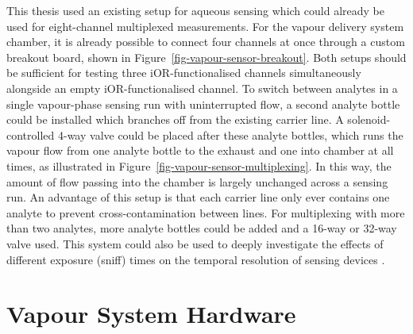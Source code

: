 \documentclass[
  a4paper,
]{scrbook}
\begin{document}
This thesis used an existing setup for aqueous sensing which could
already be used for eight-channel multiplexed measurements. For the
vapour delivery system chamber, it is already possible to connect four
channels at once through a custom breakout board, shown in
Figure~\ref{fig-vapour-sensor-breakout}. Both setups should be
sufficient for testing three iOR-functionalised channels simultaneously
alongside an empty iOR-functionalised channel. To switch between
analytes in a single vapour-phase sensing run with uninterrupted flow, a
second analyte bottle could be installed which branches off from the
existing carrier line. A solenoid-controlled 4-way valve could be placed
after these analyte bottles, which runs the vapour flow from one analyte
bottle to the exhaust and one into chamber at all times, as illustrated
in Figure~\ref{fig-vapour-sensor-multiplexing}. In this way, the amount
of flow passing into the chamber is largely unchanged across a sensing
run. An advantage of this setup is that each carrier line only ever
contains one analyte to prevent cross-contamination between lines. For
multiplexing with more than two analytes, more analyte bottles could be
added and a 16-way or 32-way valve used. This system could also be used
to deeply investigate the effects of different exposure (sniff) times on
the temporal resolution of sensing devices
\autocite{Spencer2021,Wu2024}.

\cleardoublepage
{}
{}
\appendix

\hypertarget{vapour-system-hardware}{%
\chapter{Vapour System Hardware}\label{vapour-system-hardware}}
\end{document}
